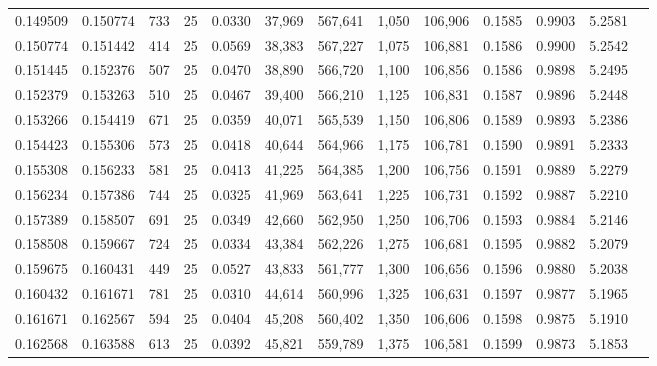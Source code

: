 \begin{tabular}{rrrrrrrrrrrrr}
0.149509 & 0.150774 &   733 &  25 &                                     0.0330 &  37,969 & 567,641 &   1,050 & 106,906 & 0.1585 & 0.9903 & 5.2581 \\
0.150774 & 0.151442 &   414 &  25 &                                     0.0569 &  38,383 & 567,227 &   1,075 & 106,881 & 0.1586 & 0.9900 & 5.2542 \\
0.151445 & 0.152376 &   507 &  25 &                                     0.0470 &  38,890 & 566,720 &   1,100 & 106,856 & 0.1586 & 0.9898 & 5.2495 \\
0.152379 & 0.153263 &   510 &  25 &                                     0.0467 &  39,400 & 566,210 &   1,125 & 106,831 & 0.1587 & 0.9896 & 5.2448 \\
0.153266 & 0.154419 &   671 &  25 &                                     0.0359 &  40,071 & 565,539 &   1,150 & 106,806 & 0.1589 & 0.9893 & 5.2386 \\
0.154423 & 0.155306 &   573 &  25 &                                     0.0418 &  40,644 & 564,966 &   1,175 & 106,781 & 0.1590 & 0.9891 & 5.2333 \\
0.155308 & 0.156233 &   581 &  25 &                                     0.0413 &  41,225 & 564,385 &   1,200 & 106,756 & 0.1591 & 0.9889 & 5.2279 \\
0.156234 & 0.157386 &   744 &  25 &                                     0.0325 &  41,969 & 563,641 &   1,225 & 106,731 & 0.1592 & 0.9887 & 5.2210 \\
0.157389 & 0.158507 &   691 &  25 &                                     0.0349 &  42,660 & 562,950 &   1,250 & 106,706 & 0.1593 & 0.9884 & 5.2146 \\
0.158508 & 0.159667 &   724 &  25 &                                     0.0334 &  43,384 & 562,226 &   1,275 & 106,681 & 0.1595 & 0.9882 & 5.2079 \\
0.159675 & 0.160431 &   449 &  25 &                                     0.0527 &  43,833 & 561,777 &   1,300 & 106,656 & 0.1596 & 0.9880 & 5.2038 \\
0.160432 & 0.161671 &   781 &  25 &                                     0.0310 &  44,614 & 560,996 &   1,325 & 106,631 & 0.1597 & 0.9877 & 5.1965 \\
0.161671 & 0.162567 &   594 &  25 &                                     0.0404 &  45,208 & 560,402 &   1,350 & 106,606 & 0.1598 & 0.9875 & 5.1910 \\
0.162568 & 0.163588 &   613 &  25 &                                     0.0392 &  45,821 & 559,789 &   1,375 & 106,581 & 0.1599 & 0.9873 & 5.1853 \\

\end{tabular}
